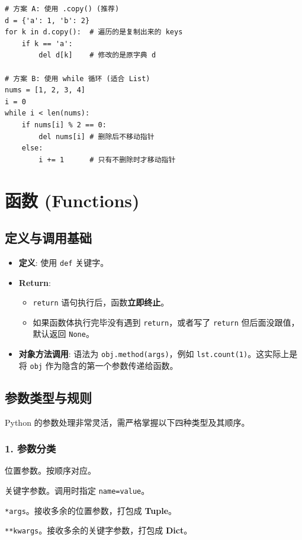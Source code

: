 \documentclass[12pt, a4paper]{article}
\begin{document}
\begin{lstlisting}[caption={安全删除元素的写法}]
# 方案 A: 使用 .copy() (推荐)
d = {'a': 1, 'b': 2}
for k in d.copy():  # 遍历的是复制出来的 keys
    if k == 'a':
        del d[k]    # 修改的是原字典 d

# 方案 B: 使用 while 循环 (适合 List)
nums = [1, 2, 3, 4]
i = 0
while i < len(nums):
    if nums[i] % 2 == 0:
        del nums[i] # 删除后不移动指针
    else:
        i += 1      # 只有不删除时才移动指针
\end{lstlisting}

\section{函数 (Functions)}

\subsection{定义与调用基础}

\begin{itemize}
    \item \textbf{定义}: 使用 \texttt{def} 关键字。
    \item \textbf{Return}: 
    \begin{itemize}
        \item \texttt{return} 语句执行后，函数\textbf{立即终止}。
        \item 如果函数体执行完毕没有遇到 \texttt{return}，或者写了 \texttt{return} 但后面没跟值，默认返回 \texttt{None}。
    \end{itemize}
    \item \textbf{对象方法调用}: 语法为 \texttt{obj.method(args)}，例如 \texttt{lst.count(1)}。这实际上是将 \texttt{obj} 作为隐含的第一个参数传递给函数。
\end{itemize}

\subsection{参数类型与规则}

Python 的参数处理非常灵活，需严格掌握以下四种类型及其顺序。

\subsubsection{1. 参数分类}
\begin{description}[style=multiline, leftmargin=4cm]
    \item[Positional Args] 位置参数。按顺序对应。
    \item[Keyword Args] 关键字参数。调用时指定 \texttt{name=value}。
    \item[Arbitrary Posi.] \texttt{*args}。接收多余的位置参数，打包成 \textbf{Tuple}。
    \item[Arbitrary Key.] \texttt{**kwargs}。接收多余的关键字参数，打包成 \textbf{Dict}。
\end{description}
\end{document}

